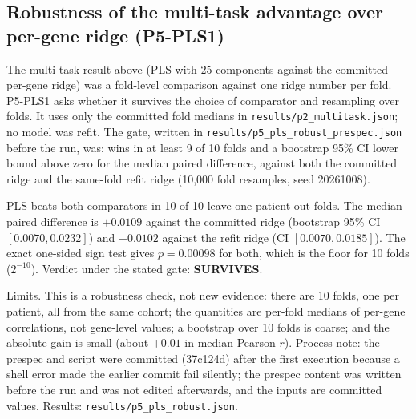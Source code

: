 \documentclass[11pt]{article}
\begin{document}
\subsection{Robustness of the multi-task advantage over per-gene ridge (P5-PLS1)}
The multi-task result above (PLS with 25 components against the committed per-gene
ridge) was a fold-level comparison against one ridge number per fold. P5-PLS1 asks
whether it survives the choice of comparator and resampling over folds. It uses
only the committed fold medians in \texttt{results/p2\_multitask.json}; no model was
refit. The gate, written in \texttt{results/p5\_pls\_robust\_prespec.json} before the
run, was: wins in at least 9 of 10 folds and a bootstrap 95\% CI lower bound above
zero for the median paired difference, against both the committed ridge and the
same-fold refit ridge (10{,}000 fold resamples, seed 20261008).

PLS beats both comparators in 10 of 10 leave-one-patient-out folds. The median
paired difference is $+0.0109$ against the committed ridge (bootstrap 95\% CI
$[0.0070, 0.0232]$) and $+0.0102$ against the refit ridge (CI $[0.0070, 0.0185]$).
The exact one-sided sign test gives $p=0.00098$ for both, which is the floor for 10
folds ($2^{-10}$). Verdict under the stated gate: \textbf{SURVIVES}.

Limits. This is a robustness check, not new evidence: there are 10 folds, one per
patient, all from the same cohort; the quantities are per-fold medians of per-gene
correlations, not gene-level values; a bootstrap over 10 folds is coarse; and the
absolute gain is small (about $+0.01$ in median Pearson $r$). Process note: the
prespec and script were committed (37c124d) after the first execution because a
shell error made the earlier commit fail silently; the prespec content was written
before the run and was not edited afterwards, and the inputs are committed values.
Results: \texttt{results/p5\_pls\_robust.json}.
\end{document}
